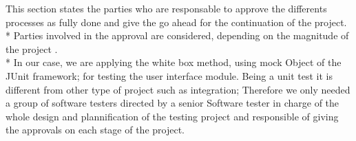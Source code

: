 This section states the parties who are responsable to approve the differents processes as fully done and give the go ahead for the continuation of the project.  \\*  
Parties involved in the approval  are considered, depending on the magnitude of the project . \\*
In our case, we are applying the white box method, using mock Object of the JUnit framework; for testing the user interface module. Being a unit test it is different from other type of project such as integration; Therefore we only needed a group of software testers directed by a senior Software tester in charge of the whole design and plannification of the testing project and responsible of giving the approvals on each stage of the project.                              